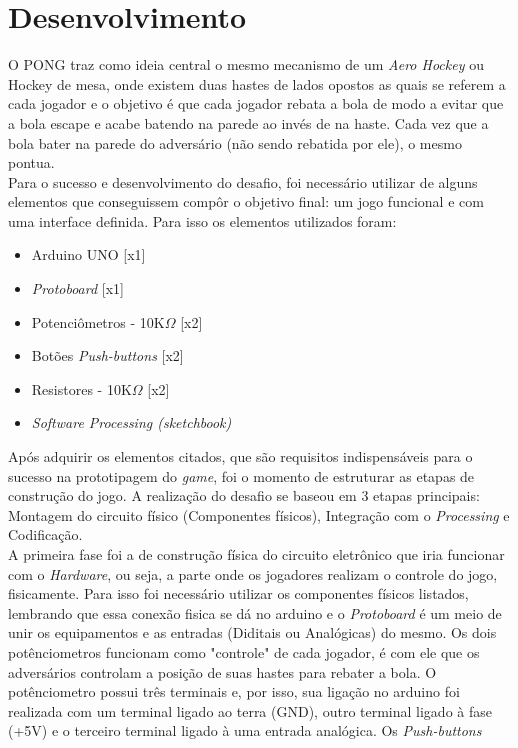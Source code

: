 \documentclass[11pt, a4paper, twocolumn]{article}
\begin{document}
\section{Desenvolvimento}
    O PONG traz como ideia central o mesmo mecanismo de um \textit{Aero Hockey} ou 
    Hockey de mesa, onde existem duas hastes de lados opostos as quais se referem a cada jogador e o objetivo é que cada 
    jogador rebata a bola de modo a evitar que a bola escape e acabe batendo na parede ao invés de na haste. Cada vez que a bola
    bater na parede do adversário (não sendo rebatida por ele), o mesmo pontua. 
    \\
    Para o sucesso e desenvolvimento do desafio, foi necessário utilizar de alguns elementos que conseguissem compôr 
    o objetivo final: um jogo funcional e com uma interface definida. Para isso os elementos utilizados foram:
    \begin{itemize}
        \item Arduino UNO [x1]
        \item \textit{Protoboard} [x1]
        \item Potenciômetros - 10K$\Omega$ [x2]
        \item Botões \textit{Push-buttons} [x2]
        \item Resistores - 10K$\Omega$ [x2]
        \item \textit{Software Processing (sketchbook)}
    \end{itemize}
    Após adquirir os elementos citados, que são requisitos indispensáveis para o sucesso na prototipagem do \textit{game}, foi o 
    momento de estruturar as etapas de construção do jogo. A realização do desafio se baseou em 3 etapas principais: Montagem do 
    circuito físico (Componentes físicos), Integração com o \textit{Processing} e Codificação.
    \\
    A primeira fase foi a de construção física do circuito eletrônico que iria funcionar com o \textit{Hardware}, ou seja,
    a parte onde os jogadores realizam o controle do jogo, fisicamente. Para isso foi necessário utilizar os componentes físicos listados, lembrando que
    essa conexão fisica se dá no arduino e o \textit{Protoboard} é um meio de unir os equipamentos e as entradas (Diditais ou Analógicas) do mesmo.
    Os dois potênciometros funcionam como "controle" de cada jogador, é com ele que os adversários controlam a posição de suas hastes para 
    rebater a bola. O potênciometro possui três terminais e, por isso, sua ligação no arduino foi realizada com um terminal ligado
    ao terra (GND), outro terminal ligado à fase (+5V) e o terceiro terminal ligado à uma entrada analógica. Os \textit{Push-buttons}
\end{document}
